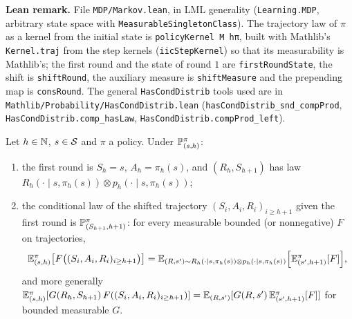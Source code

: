 \textbf{Lean remark.} File \texttt{MDP/Markov.lean}, in LML generality (\texttt{Learning.MDP},
arbitrary state space with \texttt{MeasurableSingletonClass}). The trajectory law of $\pi$ as a
kernel from the initial state is \texttt{policyKernel M hπ}, built with Mathlib's
\texttt{Kernel.traj} from the step kernels (\texttt{iicStepKernel}) so that its measurability
is Mathlib's; the first round and the state of round $1$ are
\texttt{firstRoundState}, the shift is \texttt{shiftRound}, the auxiliary measure is
\texttt{shiftMeasure} and the prepending map is \texttt{consRound}. The general
\texttt{HasCondDistrib} tools used are in \texttt{Mathlib/Probability/HasCondDistrib.lean}
(\texttt{hasCondDistrib\_snd\_compProd}, \texttt{HasCondDistrib.comp\_hasLaw},
\texttt{HasCondDistrib.compProd\_left}).

\begin{lemma}\label{lem:step_law_markov}
\leanok
{}
Let $h \in \mathbb{N}$, $s \in \mathcal{S}$ and $\pi$ a policy. Under $\mathbb{P}^\pi_{(s, h)}$:
\begin{enumerate}
  \item[(i)] the first round is $S_h = s$, $A_h = \pi_h(s)$, and $(R_h, S_{h+1})$ has law
        $R_h(\cdot \mid s, \pi_h(s)) \otimes p_h(\cdot \mid s, \pi_h(s))$;
  \item[(ii)] the conditional law of the shifted trajectory $(S_i, A_i, R_i)_{i \ge h+1}$ given
        the first round is $\mathbb{P}^\pi_{(S_{h+1}, h + 1)}$: for every measurable bounded (or
        nonnegative) $F$ on trajectories,
        \[
          \mathbb{E}^\pi_{(s, h)}\big[F\big((S_i, A_i, R_i)_{i \ge h + 1}\big)\big]
          = \mathbb{E}_{(R, s') \sim R_h(\cdot \mid s, \pi_h(s)) \otimes p_h(\cdot \mid s, \pi_h(s))}
            \Big[ \mathbb{E}^\pi_{(s', h + 1)}[F] \Big],
        \]
        and more generally
        $\mathbb{E}^\pi_{(s, h)}[G(R_h, S_{h+1})\, F((S_i, A_i, R_i)_{i \ge h+1})]
        = \mathbb{E}_{(R, s')}[G(R, s')\, \mathbb{E}^\pi_{(s', h+1)}[F]]$ for bounded measurable $G$.
\end{enumerate}
\end{lemma}

